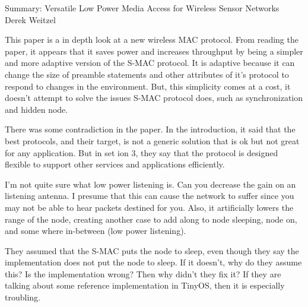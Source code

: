 \documentclass[12pt]{article}
\begin{document}
\begin{center}
{\huge Summary: Versatile Low Power Media Access for Wireless Sensor Networks } \\
Derek Weitzel
\end{center}

This paper is a in depth look at a new wireless MAC protocol.  From reading the paper, it appears that it saves power and increases throughput by being a simpler and more adaptive version of the S-MAC protocol.  It is adaptive because it can change the size of preamble statements and other attributes of it's protocol to respond to changes in the environment.  But, this simplicity comes at a cost, it doesn't attempt to solve the issues S-MAC protocol does, such as synchronization and hidden node.

There was some contradiction in the paper.  In the introduction, it said that the best protocols, and their target, is not a generic solution that is ok but not great for any application.  But in set ion 3, they say that the protocol is designed flexible to support other services and applications efficiently.

I'm not quite sure what low power listening is.  Can you decrease the gain on an listening antenna.  I presume that this can cause the network to suffer since you may not be able to hear packets destined for you.  Also, it artificially lowers the range of the node, creating another case to add along to node sleeping, node on, and some where in-between (low power listening). 

They assumed that the S-MAC puts the node to sleep, even though they say the implementation does not put the node to sleep.  If it doesn't, why do they assume this?  Is the implementation wrong?  Then why didn't they fix it?  If they are talking about some reference implementation in TinyOS, then it is especially troubling.   
\end{document}

